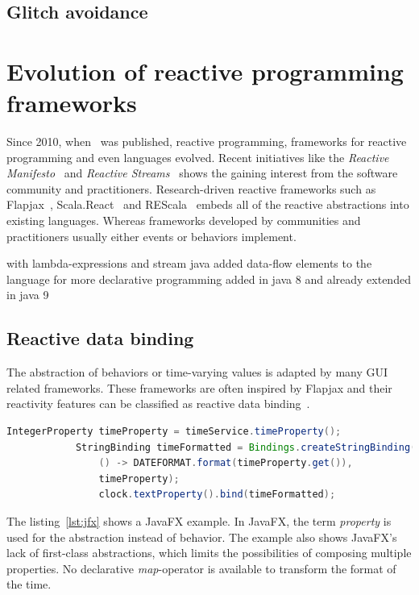 \documentclass[acmsmall]{acmart}\settopmatter{printfolios=true,printccs=false,printacmref=false}
\begin{document}
	\subsection{Glitch avoidance}

\section{Evolution of reactive programming frameworks}
	Since 2010, when~\cite{Maier:2010} was published, reactive programming, 
	frameworks for reactive programming and even languages evolved.
	Recent initiatives like the \textit{Reactive Manifesto}~\cite{reactiveManifesto2014} and
	\textit{Reactive Streams}~\cite{reactiveStreams} shows the gaining interest from the software community and practitioners.
	Research-driven reactive frameworks such as Flapjax~\cite{Meyerovich:2009}, 
	Scala.React~\cite{Maier:2012} and REScala~\cite{Salvaneschi:2014} embeds all of the reactive abstractions into existing languages.
	Whereas frameworks developed by communities and practitioners usually either events or behaviors implement.


	with lambda-expressions and stream java added data-flow elements to the language for more declarative programming
	added in java 8 and already extended in java 9

	\subsection{Reactive data binding}
		The abstraction of behaviors or time-varying values is adapted by many GUI related frameworks.
		These frameworks are often inspired by Flapjax and their 
		reactivity features can be classified as reactive data binding~\cite{Maier:2010}.

		\begin{lstlisting}[style=myScalastyle,frame=none,language=java, caption={JavaFX-properties: The time, 
			provided by the \lstinline|timeService| is bound to a formatter-binding and the 
			formatted time is then bound to a UI-Label called \lstinline|clock|
			}, label={lst:jfx}]
			IntegerProperty timeProperty = timeService.timeProperty();
			StringBinding timeFormatted = Bindings.createStringBinding(
				() -> DATEFORMAT.format(timeProperty.get()),
				timeProperty);
				clock.textProperty().bind(timeFormatted);
		\end{lstlisting}
		The listing~\ref{lst:jfx} shows a JavaFX example. 
		In JavaFX, the term \textit{property} is used for the abstraction instead of behavior. 
		The example also shows JavaFX's lack of first-class abstractions,
		which limits the possibilities of composing multiple properties. 
		No declarative \textit{map}-operator is available to transform the format of the time.
\end{document}
